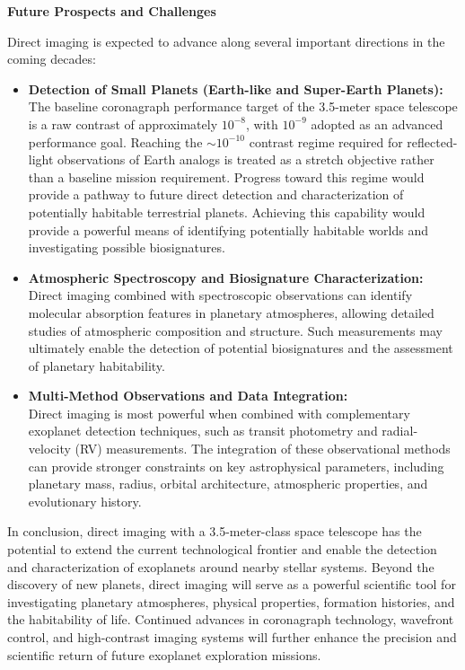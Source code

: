 \vspace{\baselineskip}
\textbf{Future Prospects and Challenges}

Direct imaging is expected to advance along several important directions in the coming decades:

\begin{itemize}
\item
  \textbf{Detection of Small Planets (Earth-like and Super-Earth Planets):}\\
  The baseline coronagraph performance target of the 3.5-meter space telescope is a raw contrast of approximately \(10^{-8}\), with \(10^{-9}\) adopted as an advanced performance goal. Reaching the \(\sim10^{-10}\) contrast regime required for reflected-light observations of Earth analogs is treated as a stretch objective rather than a baseline mission requirement. Progress toward this regime would provide a pathway to future direct detection and characterization of potentially habitable terrestrial planets.  
  Achieving this capability would provide a powerful means of identifying potentially habitable worlds and investigating possible biosignatures.
\item
  \textbf{Atmospheric Spectroscopy and Biosignature Characterization:}\\
  Direct imaging combined with spectroscopic observations can identify molecular absorption features in planetary atmospheres, allowing detailed studies of atmospheric composition and structure. Such measurements may ultimately enable the detection of potential biosignatures and the assessment of planetary habitability.
\item
  \textbf{Multi-Method Observations and Data Integration:}\\
  Direct imaging is most powerful when combined with complementary exoplanet detection techniques, such as transit photometry and radial-velocity (RV) measurements. The integration of these observational methods can provide stronger constraints on key astrophysical parameters, including planetary mass, radius, orbital architecture, atmospheric properties, and evolutionary history.
\end{itemize}

In conclusion, direct imaging with a 3.5-meter-class space telescope has the potential to extend the current technological frontier and enable the detection and characterization of exoplanets around nearby stellar systems. Beyond the discovery of new planets, direct imaging will serve as a powerful scientific tool for investigating planetary atmospheres, physical properties, formation histories, and the habitability of life. Continued advances in coronagraph technology, wavefront control, and high-contrast imaging systems will further enhance the precision and scientific return of future exoplanet exploration missions.

